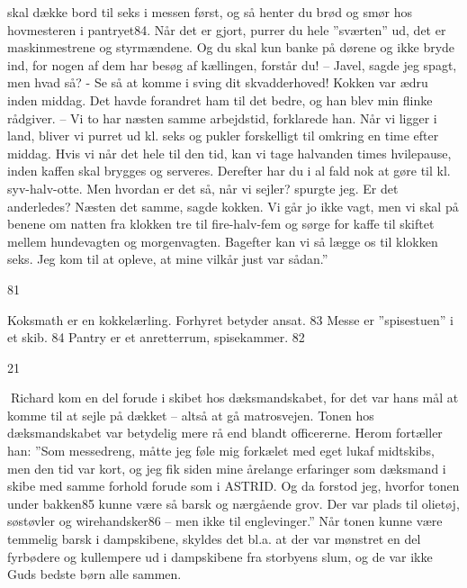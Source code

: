 skal dække bord til seks i messen først, og så henter du brød og smør
hos hovmesteren i pantryet84. Når det er gjort, purrer du hele
''sværten'' ud, det er maskinmestrene og styrmændene. Og du skal kun
banke på dørene og ikke bryde ind, for nogen af dem har besøg af
kællingen, forstår du! -- Javel, sagde jeg spagt, men hvad så? - Se så
at komme i sving dit skvadderhoved! Kokken var ædru inden middag. Det
havde forandret ham til det bedre, og han blev min flinke rådgiver. --
Vi to har næsten samme arbejdstid, forklarede han. Når vi ligger i land,
bliver vi purret ud kl. seks og pukler forskelligt til omkring en time
efter middag. Hvis vi når det hele til den tid, kan vi tage halvanden
times hvilepause, inden kaffen skal brygges og serveres. Derefter har du
i al fald nok at gøre til kl. syv-halv-otte. Men hvordan er det så, når
vi sejler? spurgte jeg. Er det anderledes? Næsten det samme, sagde
kokken. Vi går jo ikke vagt, men vi skal på benene om natten fra klokken
tre til fire-halv-fem og sørge for kaffe til skiftet mellem hundevagten
og morgenvagten. Bagefter kan vi så lægge os til klokken seks. Jeg kom
til at opleve, at mine vilkår just var sådan.''

81

Koksmath er en kokkelærling. Forhyret betyder ansat. 83 Messe er
''spisestuen'' i et skib. 84 Pantry er et anretterrum, spisekammer. 82

21

Richard kom en del forude i skibet hos dæksmandskabet, for det var hans
mål at komme til at sejle på dækket -- altså at gå matrosvejen. Tonen
hos dæksmandskabet var betydelig mere rå end blandt officererne. Herom
fortæller han: ''Som messedreng, måtte jeg føle mig forkælet med eget
lukaf midtskibs, men den tid var kort, og jeg fik siden mine årelange
erfaringer som dæksmand i skibe med samme forhold forude som i ASTRID.
Og da forstod jeg, hvorfor tonen under bakken85 kunne være så barsk og
nærgående grov. Der var plads til olietøj, søstøvler og wirehandsker86
-- men ikke til englevinger.'' Når tonen kunne være temmelig barsk i
dampskibene, skyldes det bl.a. at der var mønstret en del fyrbødere og
kullempere ud i dampskibene fra storbyens slum, og de var ikke Guds
bedste børn alle sammen.
